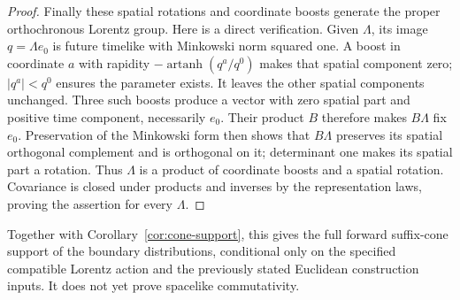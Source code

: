 \begin{proof}
Finally these spatial rotations and coordinate boosts generate the proper
orthochronous Lorentz group. Here is a direct verification. Given
$\Lambda$, its image $q=\Lambda e_0$ is future timelike with Minkowski
norm squared one. A boost in coordinate $a$ with rapidity
$-\operatorname{artanh}(q^a/q^0)$ makes that spatial component zero;
$|q^a|<q^0$ ensures the parameter exists. It leaves the other spatial
components unchanged. Three such boosts produce a vector with zero spatial
part and positive time component, necessarily $e_0$. Their product $B$
therefore makes $B\Lambda$ fix $e_0$. Preservation of the Minkowski form
then shows that $B\Lambda$ preserves its spatial orthogonal complement
and is orthogonal on it; determinant one makes its spatial part a rotation.
Thus $\Lambda$ is a product of coordinate boosts and a spatial rotation.
Covariance is closed under products and inverses by the representation
laws, proving the assertion for every $\Lambda$.
\end{proof}

Together with Corollary~\ref{cor:cone-support}, this gives the full forward
suffix-cone support of the boundary distributions, conditional only on the
specified compatible Lorentz action and the previously stated Euclidean
construction inputs. It does not yet prove spacelike commutativity.
